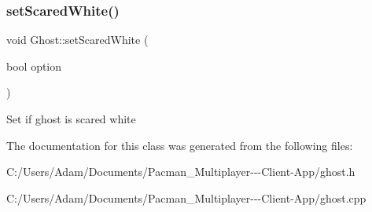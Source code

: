 \subsubsection{\texorpdfstring{set\+Scared\+White()}{setScaredWhite()}}
{\footnotesize\ttfamily void Ghost\+::set\+Scared\+White (\begin{DoxyParamCaption}\item[{bool}]{option }\end{DoxyParamCaption})\hspace{0.3cm}{\ttfamily [inline]}}

Set if ghost is scared white 

The documentation for this class was generated from the following files\+:\begin{DoxyCompactItemize}
\item 
C\+:/\+Users/\+Adam/\+Documents/\+Pacman\+\_\+\+Multiplayer-\/-\/-\/\+Client-\/\+App/ghost.\+h\item 
C\+:/\+Users/\+Adam/\+Documents/\+Pacman\+\_\+\+Multiplayer-\/-\/-\/\+Client-\/\+App/ghost.\+cpp\end{DoxyCompactItemize}
